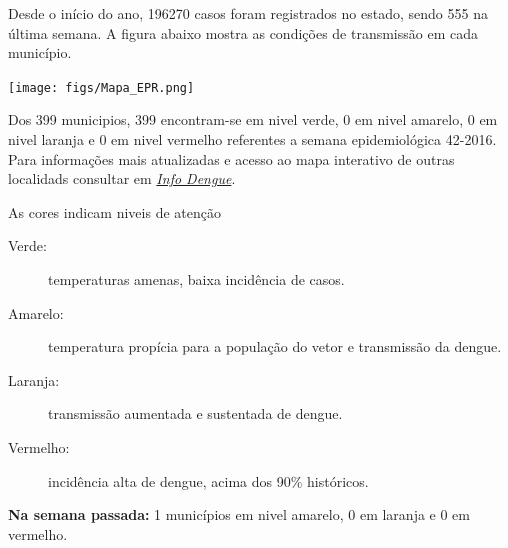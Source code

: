 \documentclass[10pt]{article} %
\begin{document}
\begin{minipage}[t]{.66\linewidth} %

\hypertarget{estado}{} %

Desde o início do ano, 196270 casos foram registrados no estado, sendo 555 na última semana. A figura abaixo mostra as condições de transmissão em cada município.

\texttt{[image: figs/Mapa\_EPR.png]}

Dos 399 municipios, 399 encontram-se em nivel verde, 0 em nivel amarelo, 0 em nivel laranja e 0 em nivel vermelho referentes a semana epidemiológica 42-2016. Para informações mais atualizadas e acesso ao mapa interativo de outras localidads consultar em \href{http://info.dengue.mat.br}{\textit{Info Dengue}}.


\vspace{1cm}
\begin{mdframed}[style=intextbox,frametitle={}] %

\hypertarget{descriptivebox}{} %
As cores indicam niveis de atenção
\begin{description}
\item[Verde:] temperaturas amenas, baixa incidência de casos.      
\item[Amarelo:] temperatura propícia para a população do vetor e transmissão da dengue.
\item[Laranja:] transmissão aumentada e sustentada de dengue. 
\item[Vermelho:] incidência alta de dengue, acima dos 90\% históricos.
\end{description}
\end{mdframed}

 \textbf{Na semana passada:} 1 municípios em nivel amarelo, 0 em laranja e 0 em vermelho.    

\end{minipage} %
\end{document}
